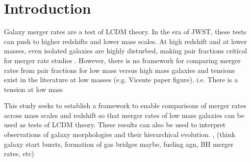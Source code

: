 \documentclass[twocolumn,linenumbers]{aastex631}
\begin{document}


\section{Introduction} \label{sec:intro}



    
    
Galaxy merger rates are a test of LCDM theory. In the era of JWST, these tests can push to higher redshifts and lower mass scales.  At high redshift and at lower masses, even isolated galaxies are highly disturbed, making pair fractions critical for merger rate studies \cite{Martin2018, RG2019}. However, there is no framework for comparing merger rates from pair fractions for low mass versus high mass galaxies and tensions exist in the literature at low masses (e.g. Vicente paper figure). i.e. There is a tension at low mass%

This study seeks to establish a framework to enable comparisons of merger rates across mass scales and redshift so that merger rates of low mass galaxies can be used as tests of LCDM theory. These results can also be used to interpret observations of galaxy morphologies and their hierarchical evolution. , (think galaxy start bursts, formation of gas bridges maybe, fueling agn, BH merger rates, etc)
\end{document}
